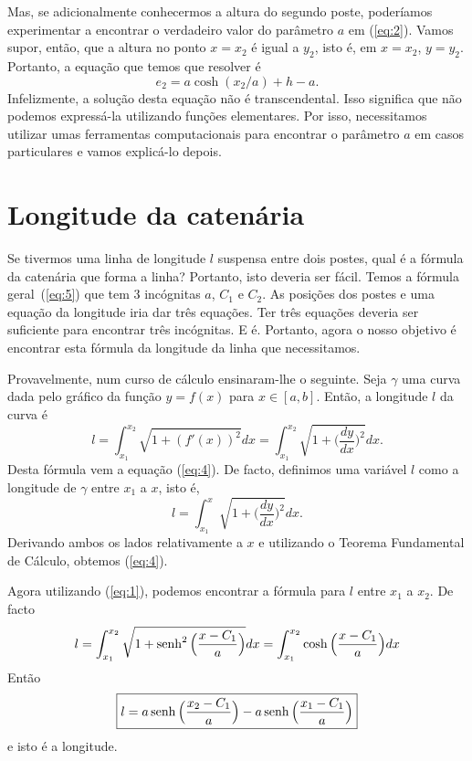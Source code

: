 Mas, se adicionalmente conhecermos a altura do segundo poste, poderíamos
experimentar a encontrar o verdadeiro valor do parâmetro $a$ em
(\ref{eq:2}). Vamos supor, então, que a altura no ponto $x=x_2$ é
igual a $y_2$, isto é, em $x=x_2$, $y=y_2$. Portanto, a equação
que temos que resolver é
\begin{displaymath}
  e_2 = a \cosh(x_2/a) + h-a.
\end{displaymath}
Infelizmente, a solução desta equação não é
transcendental. Isso significa que não podemos expressá-la utilizando
funções elementares. Por isso, necessitamos utilizar umas ferramentas
computacionais para encontrar o parâmetro $a$ em casos
particulares e vamos explicá-lo depois.




\section{Longitude da catenária}

Se tivermos uma linha de longitude $l$ suspensa entre dois postes, qual
é a fórmula da catenária que forma a linha?  Portanto, isto deveria
ser fácil. Temos a fórmula geral~(\ref{eq:5}) que tem 3
incógnitas $a$, $C_1$ e $C_2$. As posições dos postes e uma
equação da longitude iria dar três equações. Ter três
equações deveria ser suficiente para encontrar três incógnitas. E
é. Portanto, agora o nosso objetivo é encontrar esta fórmula da
longitude da linha que necessitamos.


Provavelmente, num curso de cálculo ensinaram-lhe o seguinte. Seja
$\gamma$ uma curva dada pelo gráfico da função $y=f(x)$ para
$x\in [a,b]$. Então, a longitude $l$ da curva é
\begin{equation}
  \label{eq:6}
  l=\int_{x_1}^{x_2} \sqrt{1+(f'(x))^2}dx=\int_{x_1}^{x_2} \sqrt{1+\Big(\frac{dy}{dx}\Big)^2}dx.
\end{equation}
Desta fórmula vem a equação (\ref{eq:4}). De facto, definimos
uma variável $l$ como a longitude de $\gamma$ entre $x_1$ a $x$, isto é,
\begin{equation}
  \label{eq:10}
  l=\int_{x_1}^x \sqrt{1+\Big(\frac{dy}{dx}\Big)^2}dx.
\end{equation}
Derivando ambos os lados relativamente a $x$ e utilizando o Teorema
Fundamental de Cálculo, obtemos (\ref{eq:4}).

Agora utilizando (\ref{eq:1}), podemos encontrar a fórmula para $l$
entre $x_1$ a $x_2$. De facto
\begin{displaymath}
  l=\int_{x_1}^{x_2} \sqrt{1+\operatorname{senh}^2\Big(\frac{x-C_1}{a}\Big)}dx
  =\int_{x_1}^{x_2} \cosh\Big(\frac{x-C_1}{a}\Big)dx
\end{displaymath}
Então
\begin{equation}
  \label{eq:11}
  \boxed{l=a\operatorname{senh}\Big(\frac{x_2-C_1}{a}\Big)-a\operatorname{senh}\Big(\frac{x_1-C_1}{a}\Big)}
\end{equation}
e isto é a longitude.

